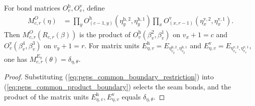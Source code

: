 \begin{definition}%
    \label{def:peps_four_cut_common_product_boundary}
    \leanok
    For bond matrices $O^{\mathrm h}_v,O^{\mathrm v}_v$, define
    \begin{align}
        M^{O}_{c,r}(\eta)
         & =\prod_y O^{\mathrm h}_{(c-1,y)}
        (\eta^{\mathrm h,2}_y,\eta^{\mathrm h,1}_y)
        \prod_x O^{\mathrm v}_{(x,r-1)}
        (\eta^{\mathrm v,2}_x,\eta^{\mathrm v,1}_x).
        \label{eq:peps_common_product_boundary}
    \end{align}
    Then $M^O_{c,r}(R_{c,r}(\beta))$ is the product of
    $O^{\mathrm h}_v(\beta_v^2,\beta_v^1)$ on $v_x+1=c$ and
    $O^{\mathrm v}_v(\beta_v^4,\beta_v^3)$ on $v_y+1=r$. For matrix units
    $E^{\mathrm h}_{\eta,v}=E_{\eta^{\mathrm h,2}_{v_y},\eta^{\mathrm h,1}_{v_y}}$
    and
    $E^{\mathrm v}_{\eta,v}=E_{\eta^{\mathrm v,2}_{v_x},\eta^{\mathrm v,1}_{v_x}}$,
    one has $M^{E_\eta}_{c,r}(\theta)=\delta_{\eta,\theta}$.
\end{definition}
\begin{proof}\leanok
    Substituting (\ref{eq:peps_common_boundary_restriction}) into
    (\ref{eq:peps_common_product_boundary}) selects the seam bonds, and the
    product of the matrix units $E^{\mathrm h}_{\eta,v},E^{\mathrm v}_{\eta,v}$
    equals $\delta_{\eta,\theta}$.
\end{proof}

